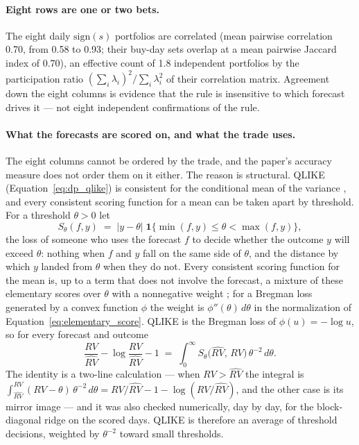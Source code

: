 \paragraph{Eight rows are one or two bets.} The eight daily $\mathrm{sign}(s)$
portfolios are correlated (mean pairwise correlation 0.70, from
0.58 to 0.93; their buy-day sets overlap at a mean pairwise Jaccard
index of 0.70), an effective count of 1.8 independent portfolios by the
participation ratio $(\sum_i \lambda_i)^2 / \sum_i \lambda_i^2$ of their
correlation matrix. Agreement down the eight
columns is evidence that the rule is insensitive to
which forecast drives it --- not eight independent confirmations of the rule.

\ifdefined\murOracleAgree\else\fi
\paragraph{What the forecasts are scored on, and what the trade uses.} The
eight columns cannot be ordered by the trade,
and the paper's accuracy measure does not order them on it either. The reason
is structural. QLIKE (Equation~\eqref{eq:dp_qlike}) is consistent for the
conditional mean of the variance \citep{Patton2011}, and every consistent
scoring function for a mean can be taken apart by threshold. For a threshold
$\theta > 0$ let
\begin{equation}
    S_\theta(f, y) \;=\; |y - \theta|\;
    \mathbf{1}\{\min(f, y) \le \theta < \max(f, y)\},
    \label{eq:elementary_score}
\end{equation}
the loss of someone who uses the forecast $f$ to decide whether the outcome
$y$ will exceed $\theta$: nothing when $f$ and $y$ fall on the same side of
$\theta$, and the distance by which $y$ landed from $\theta$ when they do not.
Every consistent scoring function for the mean is, up to a term that does not
involve the forecast, a mixture of these elementary scores over $\theta$ with
a nonnegative weight \citep{Ehm2016}; for a Bregman loss generated by a convex
function $\phi$ the weight is $\phi''(\theta)\,d\theta$ in the normalization of
Equation~\eqref{eq:elementary_score}. QLIKE is the Bregman loss of
$\phi(u) = -\log u$, so for every forecast and outcome
\begin{equation}
    \frac{RV}{\widehat{RV}} - \log\frac{RV}{\widehat{RV}} - 1
    \;=\; \int_0^\infty S_\theta\bigl(\widehat{RV},\,RV\bigr)\,
    \theta^{-2}\,d\theta .
    \label{eq:qlike_mixture}
\end{equation}
The identity is a two-line calculation --- when $RV > \widehat{RV}$ the
integral is $\int_{\widehat{RV}}^{RV}(RV-\theta)\,\theta^{-2}\,d\theta =
RV/\widehat{RV} - 1 - \log(RV/\widehat{RV})$, and the other case is its mirror
image --- and it was also checked numerically, day by day, for the
block-diagonal ridge on the scored days. QLIKE is therefore an average of
threshold decisions, weighted by $\theta^{-2}$ toward small thresholds.

